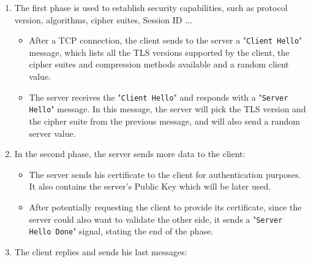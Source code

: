 \documentclass[target=bach,aauheader=,style=]{thud}
\begin{document}
\begin{enumerate}
\item The first phase is used to establish security capabilities, such as protocol version, algorithms, cipher suites, Session ID ...

\begin{itemize}
	\item After a TCP connection, the client sends to the server a "\lstinline[style=bash]|Client Hello|" message, which lists all the TLS versions supported by the client, the cipher suites and compression methods available and a random client value.
	\item The server receives the "\lstinline[style=bash]|Client Hello|" and responds with a "\lstinline[style=bash]|Server Hello|" message. In this message, the server will pick the TLS version and the cipher suite from the previous message, and will also send a random server value.
\end{itemize}

\item In the second phase, the server sends more data to the client:

\begin{itemize}
	\item The server sends his certificate to the client for authentication purposes. It also contains the server's Public Key which will be later used.
	\item After potentially requesting the client to provide its certificate, since the server could also want to validate the other side, it sends a "\lstinline[style=bash]|Server Hello Done|" signal, stating the end of the phase.
\end{itemize}

\item The client replies and sends his last messages:


\end{enumerate}
\end{document}
